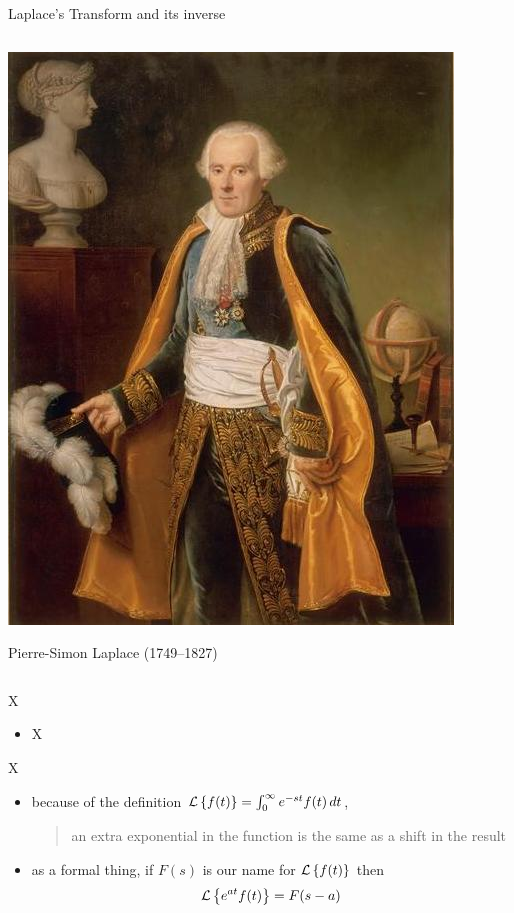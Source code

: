 \documentclass[urlcolor=blue,dvipsnames]{beamer}
\begin{document}
\begin{frame}{Laplace's Transform and its inverse}
\begin{columns}
\begin{column}{0.23\textwidth}
\vspace{3mm}
\includegraphics[width=\textwidth]{figs/Laplace-grand}

\tiny
Pierre-Simon Laplace (1749--1827) 
\end{column}
\end{columns}
\end{frame}

\begin{frame}{X}

\begin{itemize}
\item X
\end{itemize}
\end{frame}


\begin{frame}{X}

\begin{itemize}
\item because of the definition $\mathcal{L}\left\{f(t)\right\} = \int_0^\infty e^{-st} f(t)\,dt$,

\begin{quote}
\alert{an extra exponential in the function is the same as a shift in the result}
\end{quote}

\item as a formal thing, if $F(s)$ is our name for $\mathcal{L}\left\{f(t)\right\}$ then
    $$\mathcal{L}\left\{e^{at} f(t)\right\} = F(s-a)$$
\end{itemize}
\end{frame}
\end{document}
